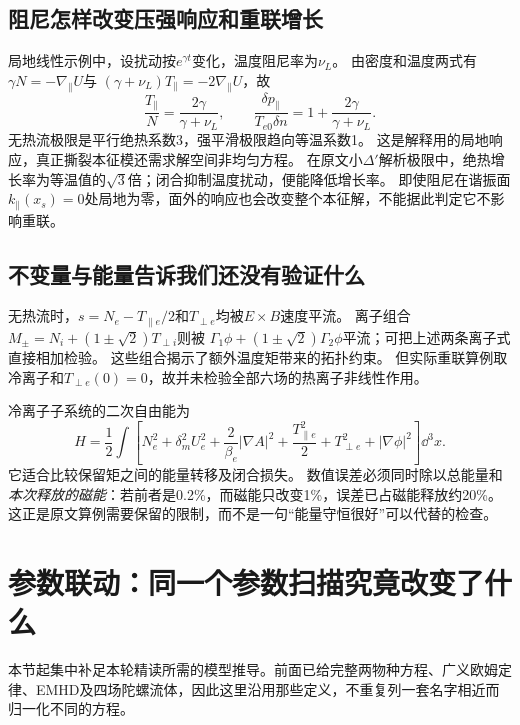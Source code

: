 \documentclass[UTF8,a4paper,11pt,openany,fontset=fandol]{ctexbook}
\begin{document}
\subsection{阻尼怎样改变压强响应和重联增长}
局地线性示例中，设扰动按$e^{\gamma t}$变化，温度阻尼率为$\nu_L$。
由密度和温度两式有
$\gamma N=-\nabla_\parallel U$与
$(\gamma+\nu_L)T_\parallel=-2\nabla_\parallel U$，故
\begin{equation}
 \frac{T_\parallel}{N}=\frac{2\gamma}{\gamma+\nu_L},\qquad
 \frac{\delta p_\parallel}{T_{e0}\delta n}
 =1+\frac{2\gamma}{\gamma+\nu_L}.
\end{equation}
无热流极限是平行绝热系数3，强平滑极限趋向等温系数1。
这是解释用的局地响应，真正撕裂本征模还需求解空间非均匀方程。
在原文小$\Delta'$解析极限中，绝热增长率为等温值的$\sqrt3$倍；闭合抑制温度扰动，便能降低增长率。
即使阻尼在谐振面$k_\parallel(x_s)=0$处局地为零，面外的响应也会改变整个本征解，不能据此判定它不影响重联。

\subsection{不变量与能量告诉我们还没有验证什么}
无热流时，$s=N_e-T_{\parallel e}/2$和$T_{\perp e}$均被$E\times B$速度平流。
离子组合$M_\pm=N_i+(1\pm\sqrt2)T_{\perp i}$则被
$\Gamma_1\phi+(1\pm\sqrt2)\Gamma_2\phi$平流；可把上述两条离子式直接相加检验。
这些组合揭示了额外温度矩带来的拓扑约束。
但实际重联算例取冷离子和$T_{\perp e}(0)=0$，故并未检验全部六场的热离子非线性作用。

冷离子子系统的二次自由能为
\begin{equation}
 H=\frac12\int\left[N_e^2+\delta_m^2U_e^2
 +\frac2{\beta_e}|\nabla A|^2+\frac{T_{\parallel e}^2}{2}
 +T_{\perp e}^2+|\nabla\phi|^2\right]\dd^3x.
\end{equation}
它适合比较保留矩之间的能量转移及闭合损失。
数值误差必须同时除以总能量和\emph{本次释放的磁能}：若前者是0.2\%，而磁能只改变1\%，误差已占磁能释放约20\%。
这正是原文算例需要保留的限制，而不是一句“能量守恒很好”可以代替的检查。

\section{参数联动：同一个参数扫描究竟改变了什么}
本节起集中补足本轮精读所需的模型推导。前面已给完整两物种方程、广义欧姆定律、EMHD及四场陀螺流体，因此这里沿用那些定义，不重复列一套名字相近而归一化不同的方程。
\end{document}
